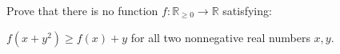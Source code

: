 Prove that there is no function $f:\mathbb{R}_{\ge0}\rightarrow\mathbb{R}$ satisfying:

$f(x+y^2)\ge f(x)+y$ for all two nonnegative real numbers $x,y$.